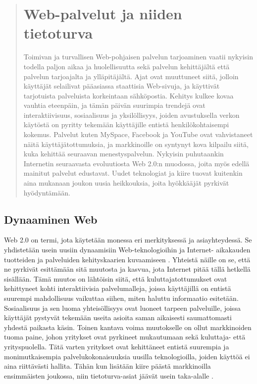 
\ifdefined\seminaari
\begin{abstract}
\else
\chapter{Web-palvelut ja niiden tietoturva}
\fi

Toimivan ja turvallisen Web-pohjaisen palvelun tarjoaminen vaatii
nykyisin todella paljon aikaa ja huolellisuutta sekä palvelun kehittäjältä että
palvelun tarjoajalta ja ylläpitäjältä. Ajat ovat muuttuneet siitä,
jolloin käyttäjät selailivat pääasiassa staattisia Web-sivuja, ja käyttivät tarjotuista
palveluista korkeintaan sähköpostia. Kehitys kulkee kovaa vauhtia eteenpäin, ja
tämän päivän suurimpia trendejä ovat interaktiivisuus, sosiaalisuus ja yksilöllisyys, 
joiden avustuksella verkon käytöstä on pyritty tekemään
käyttäjille entistä henkilökohtaisempi kokemus. Palvelut kuten MySpace,
Facebook ja YouTube ovat vahvistaneet näitä käyttäjätottumuksia, ja
markkinoille on syntynyt kova kilpailu siitä, kuka kehittää seuraavan
menestyspalvelun. Nykyisin puhutaankin Internetin seuraavasta evoluutiosta Web 2.0:n 
muodossa, joita myös edellä mainitut palvelut edustavat. Uudet teknologiat ja
kiire tuovat kuitenkin aina mukanaan joukon uusia heikkouksia, joita hyökkääjät
pyrkivät hyödyntämään. 

\ifdefined\seminaari
\end{abstract}
\license
\pagebreak
\else
\relax
\fi

\section{Dynaaminen Web}

Web 2.0 on termi, jota käytetään monessa eri merkityksessä ja
asiayhteydessä. Se yhdistetään usein uusiin dynaamisiin Web-\-teknologioihin ja In\-ter\-net-
ai\-ka\-kau\-den tuotteiden ja palveluiden kehityskaarien kuvaamiseen \cite{WEB2}. Yhteistä näille
on se, että ne pyrkivät esittämään sitä muutosta ja kasvua, jota Internet pitää tällä
hetkellä sisällään. Tämä muutos on lähtöisin siitä, että kuluttajatottumukset
ovat kehittyneet kohti interaktiivisia palvelumalleja, joissa käyttäjillä on
entistä suurempi mahdollisuus vaikuttaa siihen, miten haluttu informaatio esitetään.
Sosiaalisuus ja sen luoma yhteisöllisyys ovat luoneet tarpeen palveluille,
joissa käyttäjät pystyvät tekemään useita asioita saman aikaisesti saumattomasti
yhdestä paikasta käsin. Toinen kantava voima  muutokselle on ollut markkinoiden
tuoma paine, johon yritykset ovat pyrkineet mukautumaan sekä kuluttaja- että yrityspuolella. 
Tätä varten yritykset ovat kehittäneet entistä suurempia ja 
monimutkaisempia palvelukokonaisuuksia uusilla teknologioilla, joiden käyttöä ei aina riittävästi hallita. 
Tähän kun lisätään kiire päästä markkinoilla ensimmäisten
joukossa, niin tietoturva-asiat jäävät usein taka-alalle \cite{WEB2b}.

